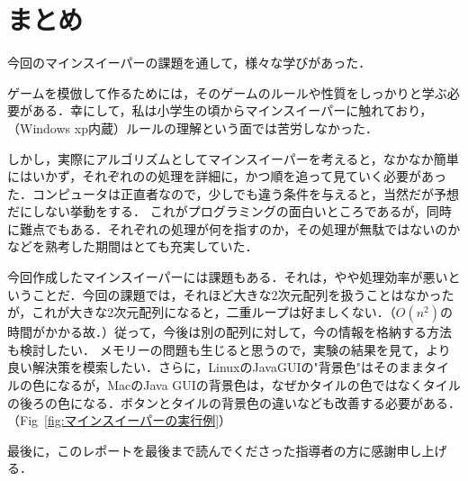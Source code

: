 \documentclass[a4j,11pt]{jsarticle}
\newcommand{\figref}[1]{Fig\ \ref{#1}}
\begin{document}
\part{まとめ}
今回のマインスイーパーの課題を通して，様々な学びがあった．\par
ゲームを模倣して作るためには，そのゲームのルールや性質をしっかりと学ぶ必要がある．幸にして，私は小学生の頃からマインスイーパーに触れており，（Windows xp内蔵）ルールの理解という面では苦労しなかった．\par
しかし，実際にアルゴリズムとしてマインスイーパーを考えると，なかなか簡単にはいかず，それぞれのの処理を詳細に，かつ順を追って見ていく必要があった．コンピュータは正直者なので，少しでも違う条件を与えると，当然だが予想だにしない挙動をする．
これがプログラミングの面白いところであるが，同時に難点でもある．それぞれの処理が何を指すのか，その処理が無駄ではないのかなどを熟考した期間はとても充実していた．\par
今回作成したマインスイーパーには課題もある．それは，やや処理効率が悪いということだ．今回の課題では，それほど大きな2次元配列を扱うことはなかったが，これが大きな2次元配列になると，二重ループは好ましくない．（\(O(n^2)\)の時間がかかる故．）従って，今後は別の配列に対して，今の情報を格納する方法も検討したい．
メモリーの問題も生じると思うので，実験の結果を見て，より良い解決策を模索したい．さらに，LinuxのJavaGUIの"背景色"はそのままタイルの色になるが，MacのJava GUIの背景色は，なぜかタイルの色ではなくタイルの後ろの色になる．ボタンとタイルの背景色の違いなども改善する必要がある．（\figref{fig:マインスイーパーの実行例}）\par
最後に，このレポートを最後まで読んでくださった指導者の方に感謝申し上げる．
\end{document}
